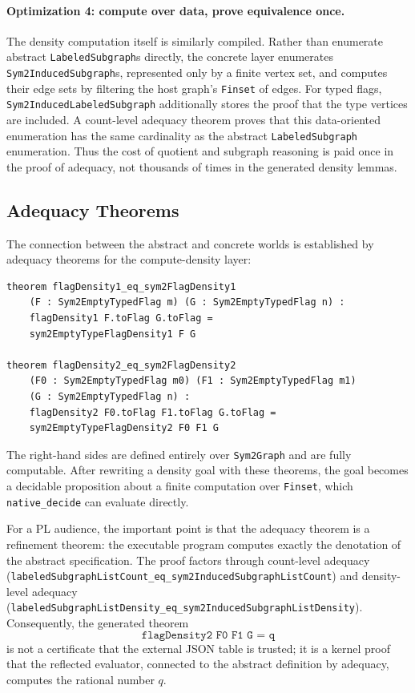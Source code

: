 \documentclass{article}
\newcommand{\lean}[1]{\texttt{#1}}
\begin{document}
\paragraph{Optimization 4: compute over data, prove equivalence once.}
The density computation itself is similarly compiled.  Rather than enumerate
abstract \lean{LabeledSubgraph}s directly, the concrete layer enumerates
\lean{Sym2InducedSubgraph}s, represented only by a finite vertex set, and
computes their edge sets by filtering the host graph's \lean{Finset} of edges.
For typed flags, \lean{Sym2InducedLabeledSubgraph} additionally stores the
proof that the type vertices are included.  A count-level adequacy theorem
proves that this data-oriented enumeration has the same cardinality as the
abstract \lean{LabeledSubgraph} enumeration.  Thus the cost of quotient and
subgraph reasoning is paid once in the proof of adequacy, not thousands of
times in the generated density lemmas.

\subsection{Adequacy Theorems}

The connection between the abstract and concrete worlds is established by
adequacy theorems for the compute-density layer:

\begin{lstlisting}
theorem flagDensity1_eq_sym2FlagDensity1
    (F : Sym2EmptyTypedFlag m) (G : Sym2EmptyTypedFlag n) :
    flagDensity1 F.toFlag G.toFlag =
    sym2EmptyTypeFlagDensity1 F G

theorem flagDensity2_eq_sym2FlagDensity2
    (F0 : Sym2EmptyTypedFlag m0) (F1 : Sym2EmptyTypedFlag m1)
    (G : Sym2EmptyTypedFlag n) :
    flagDensity2 F0.toFlag F1.toFlag G.toFlag =
    sym2EmptyTypeFlagDensity2 F0 F1 G
\end{lstlisting}
The right-hand sides are defined entirely over \lean{Sym2Graph}
and are fully computable.  After rewriting a density goal with these theorems,
the goal becomes a decidable proposition about a finite computation over
\lean{Finset}, which \lean{native\_decide} can evaluate directly.

For a PL audience, the important point is that the adequacy theorem is a
refinement theorem: the executable program computes exactly the denotation of
the abstract specification.  The proof factors through count-level adequacy
(\lean{labeledSubgraphListCount\_eq\_sym2InducedSubgraphListCount}) and
density-level adequacy
(\lean{labeledSubgraphListDensity\_eq\_sym2InducedSubgraphListDensity}).
Consequently, the generated theorem
\[
  \lean{flagDensity2 F0 F1 G = q}
\]
is not a certificate that the external JSON table is trusted; it is a kernel
proof that the reflected evaluator, connected to the abstract definition by
adequacy, computes the rational number $q$.
\end{document}
